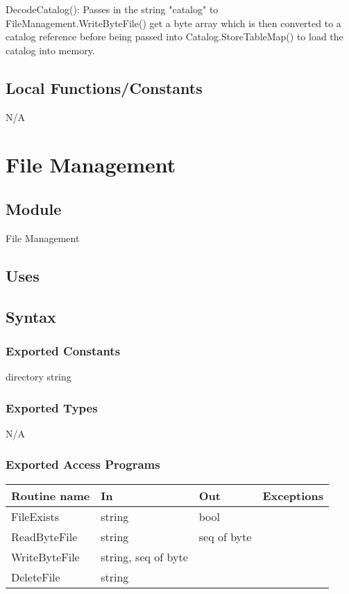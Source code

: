 \documentclass[12pt]{article}
\begin{document}
\noindent DecodeCatalog(): Passes in the string "catalog" to FileManagement.WriteByteFile() get a byte array which is then converted to a catalog reference before being passed into Catalog.StoreTableMap() to load the catalog into memory.\\

\subsection{Local Functions/Constants}
N/A

\newpage

\section{File Management}

\subsection{Module}
File Management

\subsection{Uses}

\subsection{Syntax}
\subsubsection{Exported Constants}
directory string

\subsubsection{Exported Types}
N/A

\subsubsection{Exported Access Programs}
\begin{tabular}{| l | l | l | l |}
\hline
\textbf{Routine name} & \textbf{In} & \textbf{Out} & \textbf{Exceptions}\\
\hline
FileExists & string & bool & \\
ReadByteFile & string & seq of byte & \\
WriteByteFile & string, seq of byte & & \\
DeleteFile & string & &\\
\hline
\end{tabular}
\end{document}
